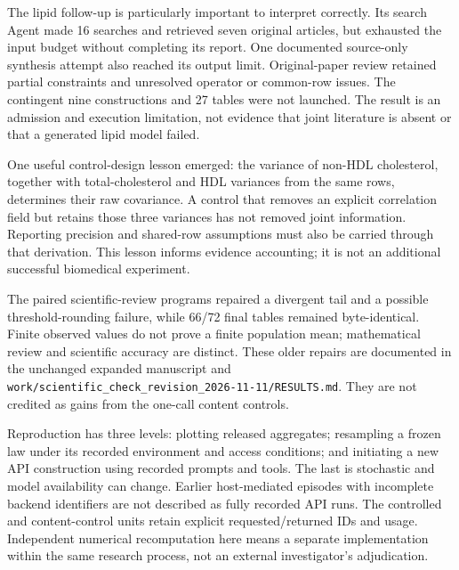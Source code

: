 \documentclass[11pt,letterpaper]{article}
\begin{document}
\endgroup

The lipid follow-up is particularly important to interpret correctly. Its search Agent made 16 searches and retrieved seven original articles, but exhausted the input budget without completing its report. One documented source-only synthesis attempt also reached its output limit. Original-paper review retained partial constraints and unresolved operator or common-row issues. The contingent nine constructions and 27 tables were not launched. The result is an admission and execution limitation, not evidence that joint literature is absent or that a generated lipid model failed.


One useful control-design lesson emerged: the variance of non-HDL cholesterol, together with total-cholesterol and HDL variances from the same rows, determines their raw covariance. A control that removes an explicit correlation field but retains those three variances has not removed joint information. Reporting precision and shared-row assumptions must also be carried through that derivation. This lesson informs evidence accounting; it is not an additional successful biomedical experiment.


The paired scientific-review programs repaired a divergent tail and a possible threshold-rounding failure, while 66/\allowbreak{}72 final tables remained byte-identical. Finite observed values do not prove a finite population mean; mathematical review and scientific accuracy are distinct. These older repairs are documented in the unchanged expanded manuscript and \texttt{work/\allowbreak{}scientific\_\allowbreak{}check\_\allowbreak{}revision\_\allowbreak{}2026-\allowbreak{}11-\allowbreak{}11/\allowbreak{}RESULTS.md}. They are not credited as gains from the one-call content controls.


Reproduction has three levels: plotting released aggregates; resampling a frozen law under its recorded environment and access conditions; and initiating a new API construction using recorded prompts and tools. The last is stochastic and model availability can change. Earlier host-mediated episodes with incomplete backend identifiers are not described as fully recorded API runs. The controlled and content-control units retain explicit requested/\allowbreak{}returned IDs and usage. Independent numerical recomputation here means a separate implementation within the same research process, not an external investigator's adjudication.
\end{document}
